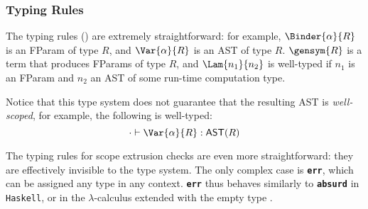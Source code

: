 


\subsubsection{Typing Rules}
The \coreLang{} typing rules () are extremely straightforward: for example, $\Binder{\alpha}{R}$ is an \textsf{FParam} of type $R$, and $\Var{\alpha}{R}$ is an \textsf{AST} of type $R$. $\gensym{R}$ is a term that produces \textsf{FParam}s of type $R$, and $\Lam{n_1}{n_2}$ is well-typed if $n_1$ is an \textsf{FParam} and $n_2$ an AST of some run-time computation type. 

Notice that this type system does not guarantee that the resulting AST is \textit{well-scoped}, for example, the following is well-typed:
\[\cdot \vdash {\Var{\alpha}{R}}: {\textsf{AST}(R)}\]

The typing rules for scope extrusion checks are even more straightforward: they are effectively invisible to the type system. The only complex case is \textbf{\texttt{err}}, which can be assigned any type in any context. \textbf{\texttt{err}} thus behaves similarly to \textbf{\texttt{absurd}} in \texttt{Haskell}, or in the $\lambda$-calculus extended with the empty type \citep{scherer-2017}.

